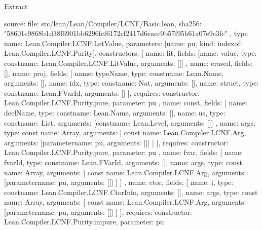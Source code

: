 \begin{lexlean}{Extract}
\begin{toolingmodule}
{{      source: {
        file: src/lean/Lean/Compiler/LCNF/Basic.lean,
        sha256: "58601e9868b1d38f6901bb6296fcf6172cf2417d6eaec0b57f95b61a07e9e3fc"
      }
    },
    type{
      name: Lean.Compiler.LCNF.LetValue,
      parameters: [{name: pu, kind: index{of: Lean.Compiler.LCNF.Purity}}],
      constructors: [
        {
          name: lit,
          fields: [{name: value, type: const{name: Lean.Compiler.LCNF.LitValue, arguments: []}}]
        },
        {name: erased, fields: []},
        {
          name: proj,
          fields: [
            {name: typeName, type: const{name: Lean.Name, arguments: []}},
            {name: idx, type: const{name: Nat, arguments: []}},
            {name: struct, type: const{name: Lean.FVarId, arguments: []}}
          ],
          requires: {constructor: Lean.Compiler.LCNF.Purity.pure, parameter: pu}
        },
        {
          name: const,
          fields: [
            {name: declName, type: const{name: Lean.Name, arguments: []}},
            {
              name: us,
              type: const{name: List, arguments: [const{name: Lean.Level, arguments: []}]}
            },
            {
              name: args,
              type: const{
                name: Array,
                arguments: [
                  const{
                    name: Lean.Compiler.LCNF.Arg,
                    arguments: [parameter{name: pu, arguments: []}]
                  }
                ]
              }
            }
          ],
          requires: {constructor: Lean.Compiler.LCNF.Purity.pure, parameter: pu}
        },
        {
          name: fvar,
          fields: [
            {name: fvarId, type: const{name: Lean.FVarId, arguments: []}},
            {
              name: args,
              type: const{
                name: Array,
                arguments: [
                  const{
                    name: Lean.Compiler.LCNF.Arg,
                    arguments: [parameter{name: pu, arguments: []}]
                  }
                ]
              }
            }
          ]
        },
        {
          name: ctor,
          fields: [
            {name: i, type: const{name: Lean.Compiler.LCNF.CtorInfo, arguments: []}},
            {
              name: args,
              type: const{
                name: Array,
                arguments: [
                  const{
                    name: Lean.Compiler.LCNF.Arg,
                    arguments: [parameter{name: pu, arguments: []}]
                  }
                ]
              }
            }
          ],
          requires: {constructor: Lean.Compiler.LCNF.Purity.impure, parameter: pu}
}}}
\end{toolingmodule}
\end{lexlean}
